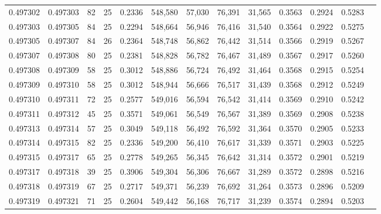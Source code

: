 \begin{tabular}{rrrrrrrrrrrrr}
0.497302 & 0.497303 &    82 &  25 &                                     0.2336 & 548,580 &  57,030 &  76,391 &  31,565 & 0.3563 & 0.2924 & 0.5283 \\
0.497303 & 0.497305 &    84 &  25 &                                     0.2294 & 548,664 &  56,946 &  76,416 &  31,540 & 0.3564 & 0.2922 & 0.5275 \\
0.497305 & 0.497307 &    84 &  26 &                                     0.2364 & 548,748 &  56,862 &  76,442 &  31,514 & 0.3566 & 0.2919 & 0.5267 \\
0.497307 & 0.497308 &    80 &  25 &                                     0.2381 & 548,828 &  56,782 &  76,467 &  31,489 & 0.3567 & 0.2917 & 0.5260 \\
0.497308 & 0.497309 &    58 &  25 &                                     0.3012 & 548,886 &  56,724 &  76,492 &  31,464 & 0.3568 & 0.2915 & 0.5254 \\
0.497309 & 0.497310 &    58 &  25 &                                     0.3012 & 548,944 &  56,666 &  76,517 &  31,439 & 0.3568 & 0.2912 & 0.5249 \\
0.497310 & 0.497311 &    72 &  25 &                                     0.2577 & 549,016 &  56,594 &  76,542 &  31,414 & 0.3569 & 0.2910 & 0.5242 \\
0.497311 & 0.497312 &    45 &  25 &                                     0.3571 & 549,061 &  56,549 &  76,567 &  31,389 & 0.3569 & 0.2908 & 0.5238 \\
0.497313 & 0.497314 &    57 &  25 &                                     0.3049 & 549,118 &  56,492 &  76,592 &  31,364 & 0.3570 & 0.2905 & 0.5233 \\
0.497314 & 0.497315 &    82 &  25 &                                     0.2336 & 549,200 &  56,410 &  76,617 &  31,339 & 0.3571 & 0.2903 & 0.5225 \\
0.497315 & 0.497317 &    65 &  25 &                                     0.2778 & 549,265 &  56,345 &  76,642 &  31,314 & 0.3572 & 0.2901 & 0.5219 \\
0.497317 & 0.497318 &    39 &  25 &                                     0.3906 & 549,304 &  56,306 &  76,667 &  31,289 & 0.3572 & 0.2898 & 0.5216 \\
0.497318 & 0.497319 &    67 &  25 &                                     0.2717 & 549,371 &  56,239 &  76,692 &  31,264 & 0.3573 & 0.2896 & 0.5209 \\
0.497319 & 0.497321 &    71 &  25 &                                     0.2604 & 549,442 &  56,168 &  76,717 &  31,239 & 0.3574 & 0.2894 & 0.5203 \\

\end{tabular}
